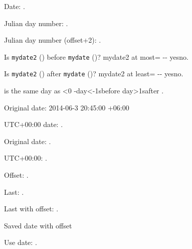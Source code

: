 \documentclass[italian]{article}
\begin{document}

Date: .

\newcount\myct
{}

Julian day number: \number\myct.


Julian day number (offset+2): \number\myct.

Is \texttt{mydate2} () before 
\texttt{mydate} ()?
\DTMifdate
 {mydate2}
 {at most=
   --}
 {yes}{no}.

Is \texttt{mydate2} () after 
\texttt{mydate} ()?
\DTMifdate
 {mydate2}
 {at least=
   --}
 {yes}{no}.


 is 
\ifnum{}
 the same day as
\else
  \ifnum\myct<0
   \number-\myct\space day\ifnum\myct<-1s\fi\space before
  \else
   \number\myct\space day\ifnum\myct>1s\fi\space after
  \fi
\fi
{}.

Original date: 2014-06-3 20:45:00 +06:00

UTC+00:00 date: .

Original date: .

UTC+00:00: .

Offset: .

Last: .

Last with offset: .

Saved date with offset

Use date: .
\end{document}
